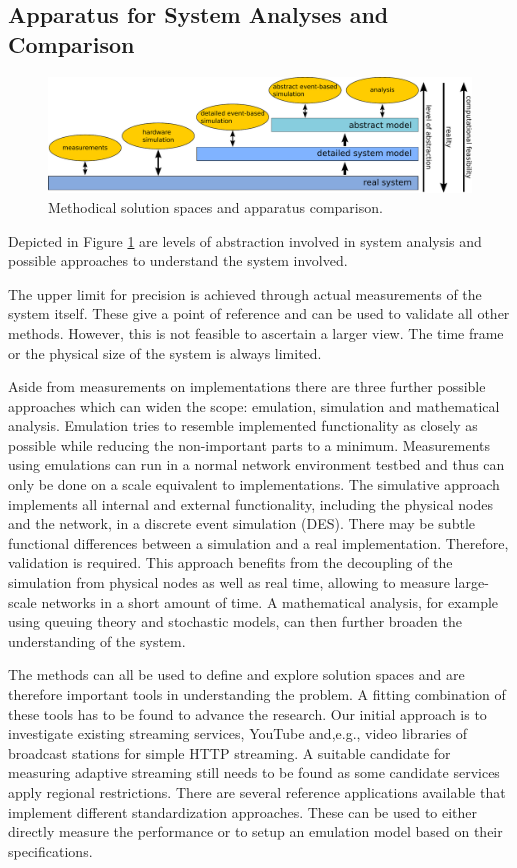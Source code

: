 \subsection{Apparatus for System Analyses and Comparison}

\begin{figure}[htbp]
    \centering
    \includegraphics[width=1.0\textwidth]{images/apparatus-new.pdf}
    \caption{Methodical solution spaces and apparatus comparison.}
    \label{c1:fig:appcomp}
\end{figure}

Depicted in Figure \ref{c1:fig:appcomp} are levels of abstraction involved in system analysis and possible approaches to understand the system involved.

The upper limit for precision is achieved through actual measurements of the system itself. These give a point of reference and can be used to validate all other methods. However, this is not feasible to ascertain a larger view. The time frame or the physical size of the system is always limited.

Aside from measurements on implementations there are three further possible approaches which can widen the scope: emulation, simulation and mathematical analysis. 
Emulation tries to resemble implemented functionality as closely as possible while reducing the non-important parts to a minimum. Measurements using emulations can run in a normal network environment testbed and thus can only be done on a scale equivalent to implementations. The simulative approach implements all internal and external functionality, including the physical nodes and the network, in a discrete event simulation (DES). There may be subtle functional differences between a simulation and a real implementation. Therefore, validation is required. This approach benefits from the decoupling of the simulation from physical nodes as well as real time, allowing to measure large-scale networks in a short amount of time.
A mathematical analysis, for example using queuing theory and stochastic models, can then further broaden the understanding of the system.


The methods can all be used to define and explore solution spaces and are therefore important tools in understanding the problem. A fitting combination of these tools has to be found to advance the research. Our initial approach is to investigate existing streaming services, YouTube \cite{metzger2011delivery,mok2011measuring} and,e.g., video libraries of broadcast stations for simple HTTP streaming. A suitable candidate for measuring adaptive streaming still needs to be found as some candidate services apply regional restrictions. There are several reference applications available that implement different standardization approaches. These can be used to either directly measure the performance or to setup an emulation model based on their specifications.


